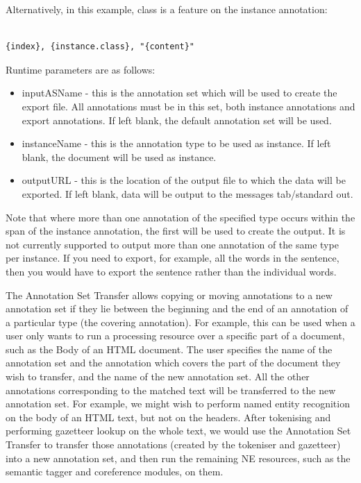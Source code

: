 Alternatively, in this example, class is a feature on the instance
annotation:

\begin{verbatim}

{index}, {instance.class}, "{content}"

\end{verbatim}

Runtime parameters are as follows:

\begin{itemize}

\item{inputASName - this is the annotation set which will be used to 
create the export file. All annotations must be in this set, both 
instance annotations and export annotations. If left blank, the default 
annotation set will be used.}

\item{instanceName - this is the annotation type to be used as instance. 
If left blank, the document will be used as instance.}

\item{outputURL - this is the location of the output file to which the 
data will be exported. If left blank, data will be output to the 
messages tab/standard out.}

\end{itemize}

Note that where more than one annotation of the specified type occurs
within the span of the instance annotation, the first will be used to
create the output. It is not currently supported to output more than
one annotation of the same type per instance. If you need to export,
for example, all the words in the sentence, then you would have to
export the sentence rather than the individual words.



The Annotation Set Transfer allows copying or moving annotations to
a new annotation set if they lie between the beginning and the end
of an annotation of a particular type (the covering annotation). For
example, this can be used when a user only wants to run a processing
resource over a specific part of a document, such as the Body of an
HTML document. The user specifies the name of the annotation set and
the annotation which covers the part of the document they wish to
transfer, and the name of the new annotation set. All the other
annotations corresponding to the matched text will be transferred to
the new annotation set. For example, we might wish to perform named
entity recognition on the body of an HTML text, but not on the
headers. After tokenising and performing gazetteer lookup on the whole
text, we would use the Annotation Set Transfer to transfer those
annotations (created by the tokeniser and gazetteer) into a new
annotation set, and then run the remaining NE resources, such as the
semantic tagger and coreference modules, on them.

